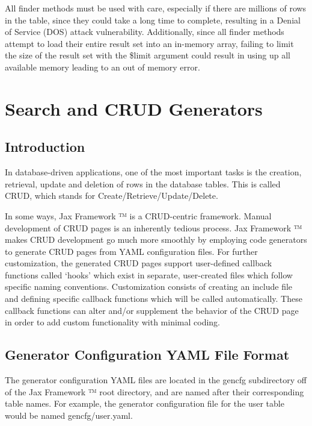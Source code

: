\documentclass[letterpaper,10pt,english]{sphinxmanual}
\begin{document}
All finder methods must be used with care, especially if there are millions of rows in the table,
since they could take a long time to complete, resulting in a Denial of Service (DOS) attack
vulnerability.  Additionally, since all finder methods attempt to load their entire result set into
an in-memory array, failing to limit the size of the result set with the \$limit argument could
result in using up all available memory leading to an out of memory error.


\chapter{Search and CRUD Generators}
\label{jaxFrameworkGuide:id18}

\section{Introduction}
\label{jaxFrameworkGuide:id19}
In database-driven applications, one of the most important tasks is the creation, retrieval, update
and deletion of rows in the database tables.  This is called CRUD, which stands for
Create/Retrieve/Update/Delete.

In some ways, Jax Framework ™ is a CRUD-centric framework.  Manual development of CRUD pages
is an inherently tedious process.  Jax Framework ™ makes CRUD development go much more
smoothly by employing code generators to generate CRUD pages from YAML configuration files.  For
further customization, the generated CRUD pages support user-defined callback functions called
`hooks' which exist in separate, user-created files which follow specific naming conventions.
Customization consists of creating an include file and defining specific callback functions which
will be called automatically.  These callback functions can alter and/or supplement the behavior of
the CRUD page in order to add custom functionality with minimal coding.


\section{Generator Configuration YAML File Format}
\label{jaxFrameworkGuide:generator-configuration-yaml-file-format}
The generator configuration YAML files are located in the gencfg subdirectory off of the Jax
Framework ™ root directory, and are named after their corresponding table names.  For example,
the generator configuration file for the user table would be named gencfg/user.yaml.
\end{document}
